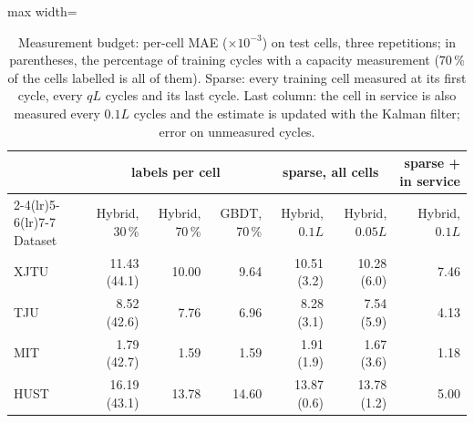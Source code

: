 \begin{table}[t]\centering\small\setlength{\tabcolsep}{4pt}
\caption{Measurement budget: per-cell MAE ($\times10^{-3}$) on test cells, three repetitions; in parentheses, the percentage of training cycles with a capacity measurement (70\,\% of the cells labelled is all of them). Sparse: every training cell measured at its first cycle, every $qL$ cycles and its last cycle. Last column: the cell in service is also measured every $0.1L$ cycles and the estimate is updated with the Kalman filter; error on unmeasured cycles.}\label{tab:budget}
\begin{adjustbox}{max width=\textwidth}\begin{tabular}{lrrrrrr}\toprule
 & \multicolumn{3}{c}{labels per cell} & \multicolumn{2}{c}{sparse, all cells} & sparse + in service \\\cmidrule(lr){2-4}\cmidrule(lr){5-6}\cmidrule(lr){7-7}
Dataset & Hybrid, 30\,\% & Hybrid, 70\,\% & GBDT, 70\,\% & Hybrid, $0.1L$ & Hybrid, $0.05L$ & Hybrid, $0.1L$ \\\midrule
XJTU & 11.43 (44.1) & 10.00 & 9.64 & 10.51 (3.2) & 10.28 (6.0) & 7.46 \\
TJU & 8.52 (42.6) & 7.76 & 6.96 & 8.28 (3.1) & 7.54 (5.9) & 4.13 \\
MIT & 1.79 (42.7) & 1.59 & 1.59 & 1.91 (1.9) & 1.67 (3.6) & 1.18 \\
HUST & 16.19 (43.1) & 13.78 & 14.60 & 13.87 (0.6) & 13.78 (1.2) & 5.00 \\
\bottomrule\end{tabular}\end{adjustbox}\end{table}
